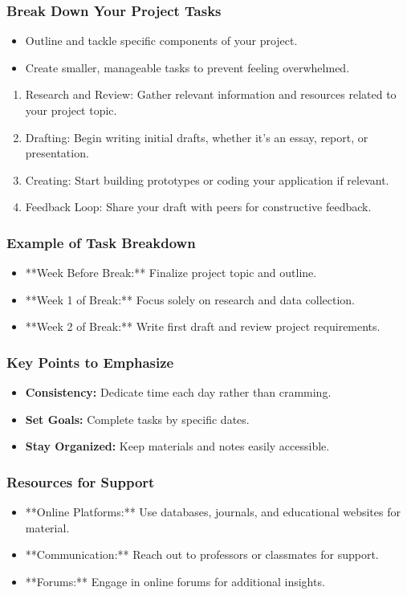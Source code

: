 \documentclass[aspectratio=169]{beamer}
\begin{document}
\begin{frame}[fragile]
    \frametitle{Break Down Your Project Tasks}
    \begin{itemize}
        \item Outline and tackle specific components of your project.
        \item Create smaller, manageable tasks to prevent feeling overwhelmed.
    \end{itemize}
    \begin{enumerate}
        \item Research and Review: Gather relevant information and resources related to your project topic.
        \item Drafting: Begin writing initial drafts, whether it's an essay, report, or presentation.
        \item Creating: Start building prototypes or coding your application if relevant.
        \item Feedback Loop: Share your draft with peers for constructive feedback.
    \end{enumerate}
\end{frame}

\begin{frame}[fragile]
    \frametitle{Example of Task Breakdown}
    \begin{itemize}
        \item **Week Before Break:** Finalize project topic and outline.
        \item **Week 1 of Break:** Focus solely on research and data collection.
        \item **Week 2 of Break:** Write first draft and review project requirements.
    \end{itemize}
\end{frame}

\begin{frame}[fragile]
    \frametitle{Key Points to Emphasize}
    \begin{itemize}
        \item \textbf{Consistency:} Dedicate time each day rather than cramming.
        \item \textbf{Set Goals:} Complete tasks by specific dates.
        \item \textbf{Stay Organized:} Keep materials and notes easily accessible.
    \end{itemize}
\end{frame}

\begin{frame}[fragile]
    \frametitle{Resources for Support}
    \begin{itemize}
        \item **Online Platforms:** Use databases, journals, and educational websites for material.
        \item **Communication:** Reach out to professors or classmates for support.
        \item **Forums:** Engage in online forums for additional insights.
    \end{itemize}
\end{frame}
\end{document}
